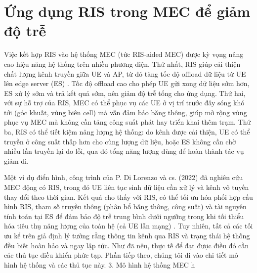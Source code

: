 \section{Ứng dụng RIS trong MEC để giảm độ trễ}

Việc kết hợp RIS vào hệ thống MEC (tức RIS-aided MEC) được kỳ vọng nâng cao hiệu năng hệ thống trên nhiều phương diện. Thứ nhất, RIS giúp cải thiện chất lượng kênh truyền giữa UE và AP, từ đó tăng tốc độ offload dữ liệu từ UE lên edge server (ES)
\cite{ris_latency}
. Tốc độ offload cao cho phép UE gửi xong dữ liệu sớm hơn, ES xử lý sớm và trả kết quả sớm, nên giảm độ trễ tổng cho ứng dụng. Thứ hai, với sự hỗ trợ của RIS, MEC có thể phục vụ các UE ở vị trí trước đây sóng khó tới (góc khuất, vùng biên cell) mà vẫn đảm bảo băng thông, giúp mở rộng vùng phục vụ MEC mà không cần tăng công suất phát hay triển khai thêm trạm. Thứ ba, RIS có thể tiết kiệm năng lượng hệ thống: do kênh được cải thiện, UE có thể truyền ở công suất thấp hơn cho cùng lượng dữ liệu, hoặc ES không cần chờ nhiều lần truyền lại do lỗi, qua đó tổng năng lượng dùng để hoàn thành tác vụ giảm đi. 



Một ví dụ điển hình, công trình của P. Di Lorenzo và cs. (2022) đã nghiên cứu MEC động có RIS, trong đó UE liên tục sinh dữ liệu cần xử lý và kênh vô tuyến thay đổi theo thời gian. Kết quả cho thấy với RIS, có thể tối ưu hóa phối hợp cấu hình RIS, tham số truyền thông (phân bổ băng thông, công suất) và tài nguyên tính toán tại ES để đảm bảo độ trễ trung bình dưới ngưỡng trong khi tối thiểu hóa tiêu thụ năng lượng của toàn hệ (cả UE lẫn mạng)
\cite{mec}
. Tuy nhiên, tất cả các tối ưu kể trên giả định lý tưởng rằng thông tin kênh qua RIS và trạng thái hệ thống đều biết hoàn hảo và ngay lập tức. Như đã nêu, thực tế để đạt được điều đó cần các thủ tục điều khiển phức tạp. Phần tiếp theo, chúng tôi đi vào chi tiết mô hình hệ thống và các thủ tục này.
3. Mô hình hệ thống MEC h